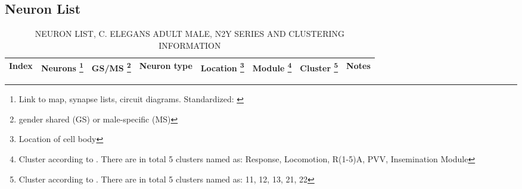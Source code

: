 \subsection{Neuron List}
\label{Male (N2Y) Neuron List}

\newpage

\setcounter{ClusterCounter}{1}

\begin{center}
  \begin{longtable}{ |p{1cm} | p{1.8cm} | p{1.8cm} | p{2.6cm} | p{3.2cm} | p{2.4cm} | p{1.5cm} | p{10cm} |}
    \caption{NEURON LIST, C. ELEGANS ADULT MALE, N2Y SERIES AND CLUSTERING INFORMATION} \tabularnewline
    \toprule
    \midrule
    Index &
    Neurons \footnote{Link to map, synapse lists, circuit diagrams. Standardized: \cite{jarrell_connectome_2012} } & 
    GS/MS \footnote{gender shared (GS) or male-specific (MS)} & 
    Neuron type & 
    Location \footnote{Location of cell body} & 
    Module \footnote{Cluster according to \cite{jarrell_connectome_2012}. There are in total 5 clusters named as: Response, Locomotion, R(1-5)A, PVV, Insemination
Module } &
    Cluster \footnote{Cluster according to \cite{sohn_topological_2011}. There are in total 5 clusters named as: 11, 12, 13, 21, 22 } &
    Notes \\ \hline




\end{longtable}
\end{center}
